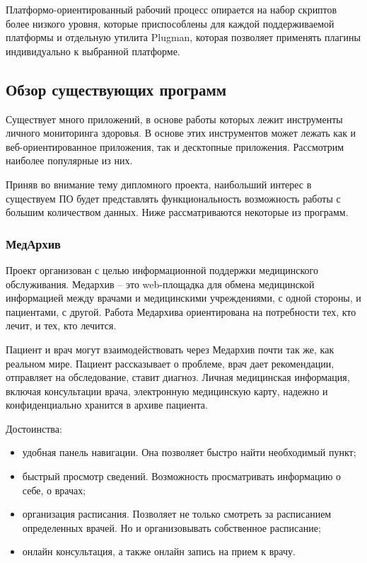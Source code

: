 Платформо-ориентированный рабочий процесс опирается на набор скриптов более низкого уровня, которые приспособлены для каждой поддерживаемой платформы и отдельную утилита Plugman, которая позволяет применять плагины индивидуально к выбранной платформе.

\subsection{Обзор существующих программ} %
\label{sub:domain:existing_programs}
Существует много приложений, в основе работы которых лежит инструменты личного мониторинга здоровья. В основе этих инструментов может лежать как и веб-ориентированное приложения, так и десктопные приложения. Рассмотрим наиболее популярные из них.

Приняв во внимание тему дипломного проекта, наибольший интерес в существуем ПО будет представлять функциональность возможность работы с большим количеством данных.
Ниже рассматриваются некоторые из программ.

\subsubsection{МедАрхив}

Проект организован с целью информационной поддержки медицинского обслуживания. Медархив -- это web-площадка для обмена медицинской информацией между врачами и медицинскими учреждениями, с одной стороны, и пациентами, с другой. Работа Медархива ориентирована на потребности тех, кто лечит, и тех, кто лечится.

Пациент и врач могут взаимодействовать через Медархив почти так же, как реальном мире. Пациент рассказывает о проблеме, врач дает рекомендации, отправляет на обследование, ставит диагноз. Личная медицинская информация, включая консультации врача, электронную медицинскую карту, надежно и конфиденциально хранится в архиве пациента.

Достоинства:
\begin{itemize}
  \item удобная панель навигации. Она позволяет быстро найти необходимый пункт;
  \item быстрый просмотр сведений. Возможность просматривать информацию о себе, о врачах;
  \item организация расписания. Позволяет не только смотреть за расписанием определенных врачей. Но и организовывать собственное расписание;
  \item онлайн консультация, а также онлайн запись на прием к врачу.
\end{itemize}

